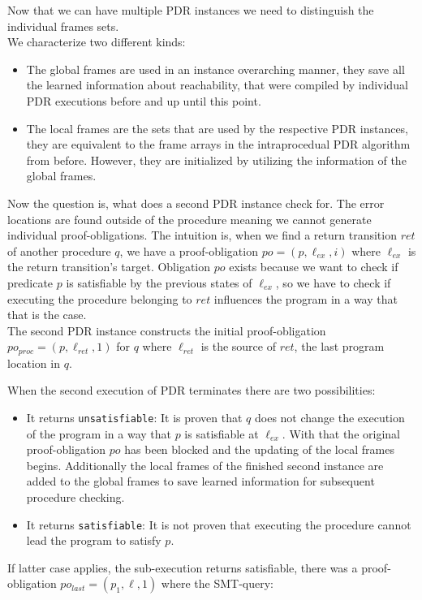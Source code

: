\documentclass{article}
\begin{document}
	Now that we can have multiple PDR instances we need to distinguish the individual frames sets. \\ We characterize two different kinds:
	\begin{itemize}
		\item The global frames are used in an instance overarching manner, they save all the learned information about reachability, that were compiled by individual PDR executions before and up until this point. 
		\item The local frames are the sets that are used by the respective PDR instances, they are equivalent to the frame arrays in the intraprocedual PDR algorithm from before. However, they are initialized by utilizing the information of the global frames.
	\end{itemize}
	Now the question is, what does a second PDR instance check for. The error locations are found outside of the procedure meaning we cannot generate individual proof-obligations.
	The intuition is, when we find a return transition $ret$ of another procedure $q$, we have a proof-obligation $po = (p, \ell_{ex}, i)$ where $\ell_{ex}$ is the return transition's target. Obligation $po$ exists because we want to check if predicate $p$ is satisfiable by the previous states of $\ell_{ex}$, so we have to check if executing the procedure belonging to $ret$ influences the program in a way that that is the case. \\ The second PDR instance constructs the initial proof-obligation $po_{proc} = (p, \ell_{ret}, 1)$ for $q$ where $\ell_{ret}$ is the source of $ret$, the last program location in $q$. \\ \par
	When the second execution of PDR terminates there are two possibilities: 
	\begin{itemize}
		\item It returns \texttt{unsatisfiable}: It is proven that $q$ does not change the execution of the program in a way that $p$ is satisfiable at $\ell_{ex}$. With that the original proof-obligation $po$ has been blocked and the updating of the local frames begins. Additionally the local frames of the finished second instance are added to the global frames to save learned information for subsequent procedure checking.
		\item It returns \texttt{satisfiable}: It is not proven that executing the procedure cannot lead the program to satisfy $p$. 
	\end{itemize}
	If latter case applies, the sub-execution returns satisfiable, there was a proof-obligation $po_{last} = (p_1, \ell, 1)$ where the SMT-query:
\end{document}
